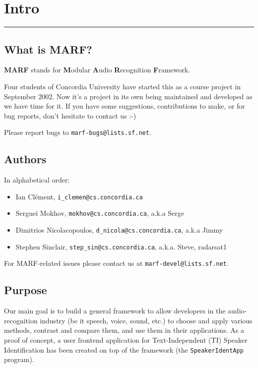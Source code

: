 \section{Intro}
\noindent
\rule{7.0in}{.013in}

\subsection{What is MARF?}

{\bf MARF} stands for {\bf M}odular {\bf A}udio {\bf R}ecognition {\bf F}ramework.

Four students of Concordia University have started this as a course
project in September 2002. Now it's a project in its own
being maintained and developed as we have time for it. If you have
some suggestions, contributions to make, or for bug reports, don't
hesitate to contact us :-)

Please report bugs to \verb+marf-bugs@lists.sf.net+.

\subsection{Authors}

In alphabetical order:

\begin{itemize}
	\item Ian Cl\'ement, \verb+i_clemen@cs.concordia.ca+
	\item Serguei Mokhov, \verb+mokhov@cs.concordia.ca+, a.k.a Serge
	\item Dimitrios Nicolacopoulos, \verb+d_nicola@cs.concordia.ca+, a.k.a Jimmy
	\item Stephen Sinclair, \verb+step_sin@cs.concordia.ca+, a.k.a. Steve, radarsat1
\end{itemize}

For MARF-related issues please contact us at \verb+marf-devel@lists.sf.net+.

\subsection{Purpose}

Our main goal is to build a general framework to allow developers in the
audio-recognition industry (be it speech, voice, sound, etc.) to choose and apply various methods,
contrast and compare them, and use them in their applications. As a proof of concept, a
user frontend application for Text-Independent (TI) Speaker Identification has
been created on top of the framework (the \verb+SpeakerIdentApp+ program).

